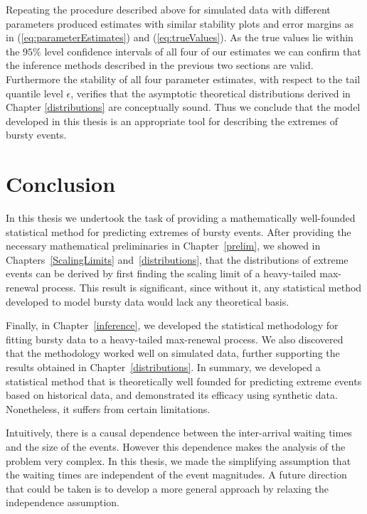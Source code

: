 \documentclass[honours,12pt,twoside, openright]{unswthesis}
\newcommand{\1}{\mathbf 1}
\numberwithin{equation}{section}
\theoremstyle{definition}
\theoremstyle{remark}
\begin{document}
Repeating the procedure described above for simulated data with different parameters produced estimates with similar stability plots and error margins as in (\ref{eq:parameterEstimates}) and (\ref{eq:trueValues}). As the true values lie within the $95\%$ level confidence intervals of all four of our estimates we can confirm that the inference methods described in the previous two sections are valid. Furthermore the stability of all four parameter estimates, with respect to the tail quantile level $\epsilon$, verifies that the asymptotic theoretical distributions derived in Chapter \ref{distributions} are conceptually sound. Thus we conclude that the model developed in this thesis is an appropriate tool for describing the extremes of bursty events.
\chapter{Conclusion}
In this thesis we undertook the task of providing a mathematically well-founded statistical method for predicting extremes of bursty events. %
After providing the necessary mathematical preliminaries in Chapter~\ref{prelim}, we showed in Chapters~\ref{ScalingLimits} and~\ref{distributions}, that the distributions of extreme events can be derived by first finding the scaling limit of a heavy-tailed max-renewal process. This result is significant, since without it, any statistical method developed to model bursty data would lack any theoretical basis.

Finally, in Chapter~\ref{inference}, we developed the statistical methodology for fitting bursty data to a heavy-tailed max-renewal process. We also discovered that the methodology worked well on simulated data, further supporting the results obtained in Chapter~\ref{distributions}. In summary, we developed a statistical method that is theoretically well founded for predicting extreme events based on historical data, and demonstrated its efficacy using synthetic data. Nonetheless, it suffers from certain limitations.

Intuitively, there is a causal dependence between the inter-arrival waiting times and the size of the events. However this dependence makes the analysis of the problem very complex. In this thesis, we made the simplifying assumption that the waiting times are independent of the event magnitudes. A future direction that could be taken is to develop a more general approach by relaxing the independence assumption. 
\end{document}
